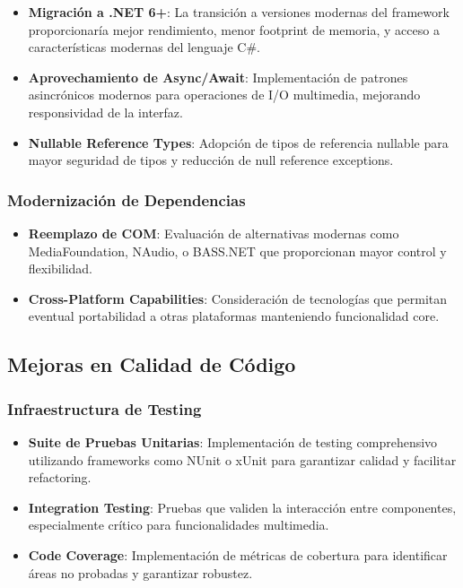 \documentclass[a4paper]{article}
\begin{document}
\begin{itemize}
\item \textbf{Migración a .NET 6+}: La transición a versiones modernas del framework proporcionaría mejor rendimiento, menor footprint de memoria, y acceso a características modernas del lenguaje C\#.

\item \textbf{Aprovechamiento de Async/Await}: Implementación de patrones asincrónicos modernos para operaciones de I/O multimedia, mejorando responsividad de la interfaz.

\item \textbf{Nullable Reference Types}: Adopción de tipos de referencia nullable para mayor seguridad de tipos y reducción de null reference exceptions.
\end{itemize}

\subsubsection{Modernización de Dependencias}

\begin{itemize}
\item \textbf{Reemplazo de COM}: Evaluación de alternativas modernas como MediaFoundation, NAudio, o BASS.NET que proporcionan mayor control y flexibilidad.

\item \textbf{Cross-Platform Capabilities}: Consideración de tecnologías que permitan eventual portabilidad a otras plataformas manteniendo funcionalidad core.
\end{itemize}

\subsection{Mejoras en Calidad de Código}

\subsubsection{Infraestructura de Testing}

\begin{itemize}
\item \textbf{Suite de Pruebas Unitarias}: Implementación de testing comprehensivo utilizando frameworks como NUnit o xUnit para garantizar calidad y facilitar refactoring.

\item \textbf{Integration Testing}: Pruebas que validen la interacción entre componentes, especialmente crítico para funcionalidades multimedia.

\item \textbf{Code Coverage}: Implementación de métricas de cobertura para identificar áreas no probadas y garantizar robustez.
\end{itemize}
\end{document}

